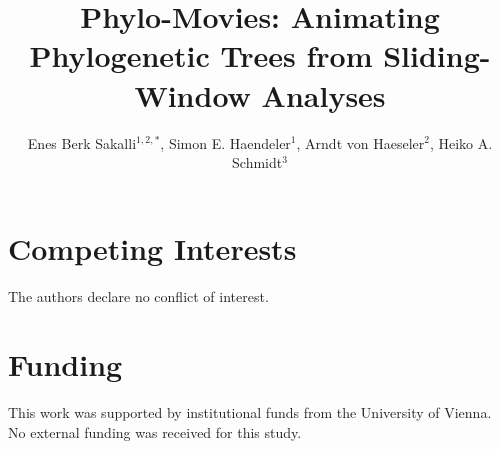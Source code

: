 \documentclass[nocrop]{mbe}
\title{Phylo-Movies: Animating Phylogenetic Trees from Sliding-Window Analyses}
\author{Enes Berk Sakalli\(^{1,2,*}\), Simon E. Haendeler\(^{1}\), Arndt von Haeseler\(^{2}\), Heiko A. Schmidt\(^{3}\)}
\begin{document}
\maketitle


\section*{Competing Interests}
The authors declare no conflict of interest.
\section*{Funding}
This work was supported by institutional funds from the University of Vienna.
No external funding was received for this study.


\end{document}
